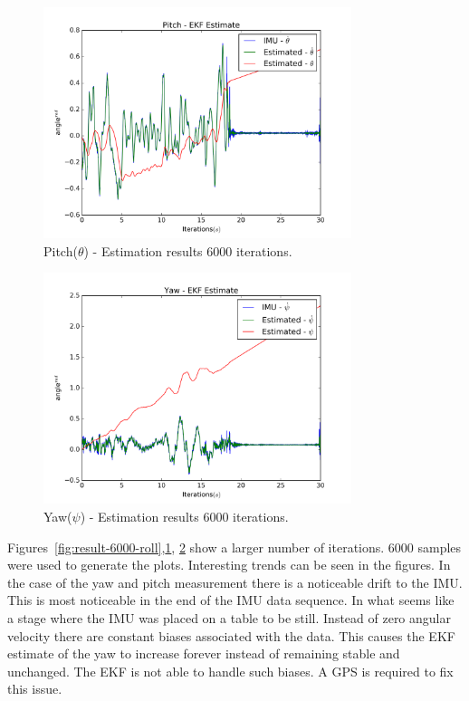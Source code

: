 \documentclass[letter]{IEEEtran}
\begin{document}
\begin{figure}
\centering
  \includegraphics[width=9cm]{pitch-result-6000-s}
\caption{Pitch($\theta$) - Estimation results 6000 iterations.}
\label{fig:result-6000-pitch}
\end{figure}

\begin{figure}
\centering
\includegraphics[width=9cm]{yaw-result-6000-s}
\caption{Yaw($\psi$) - Estimation results 6000 iterations.}
\label{fig:result-6000-yaw}
\end{figure}
Figures~\ref{fig:result-6000-roll},\ref{fig:result-6000-pitch}, \ref{fig:result-6000-yaw} show a larger number of iterations. 6000 samples were used to generate the plots. Interesting trends can be seen in the figures. In the case of the yaw and pitch measurement there is a noticeable drift to the IMU. This is most noticeable in the end of the IMU data sequence. In what seems like a stage where the IMU was placed on a table to be still. Instead of zero angular velocity there are constant biases associated with the data. This causes the EKF estimate of the yaw to increase forever instead of remaining stable and unchanged. The EKF is not able to handle such biases. A GPS is required to fix this issue.
\end{document}
